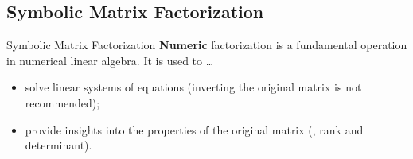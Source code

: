 \subsection{Symbolic Matrix Factorization}

\begin{frame}{Symbolic Matrix Factorization}
  \textbf{Numeric} factorization is a fundamental operation in numerical linear algebra. It is used to \dots
  \begin{itemize}
    \item solve linear systems of equations (inverting the original matrix is not recommended);
    \item provide insights into the properties of the original matrix (\ie{}, rank and determinant).
  \end{itemize}
  \vspace{1.0em}

\end{frame}

